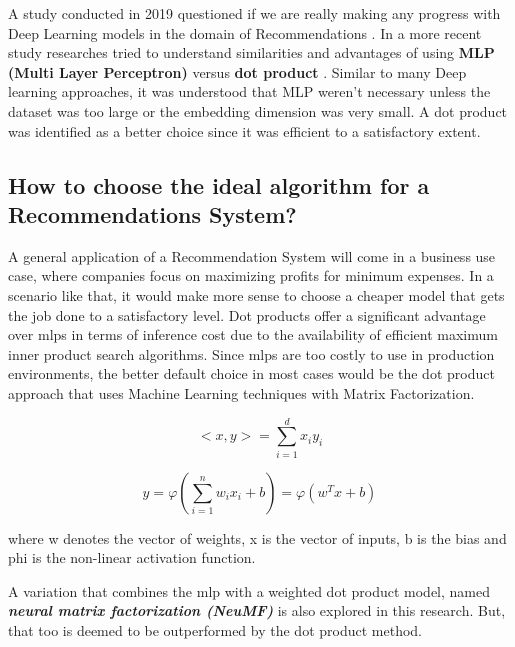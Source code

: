 A study conducted in 2019 questioned if we are really making any progress with Deep Learning models in the domain of Recommendations \autocite{dacrema_are_2019}. In a more recent study researches tried to understand similarities and advantages of using \textbf{MLP (Multi Layer Perceptron)} versus \textbf{dot product} \autocite{rendle_neural_2020}. Similar to many Deep learning approaches, it was understood that MLP weren't necessary unless the dataset was too large or the embedding dimension was very small. A dot product was identified as a better choice since it was efficient to a satisfactory extent.

\subsection{How to choose the ideal algorithm for a Recommendations System?}

A general application of a Recommendation System will come in a business use case, where companies focus on maximizing profits for minimum expenses. In a scenario like that, it would make more sense to choose a cheaper model that gets the job done to a satisfactory level. Dot products offer a significant advantage over \gls{mlp}s in terms of inference cost due to the availability of efficient maximum inner product search algorithms. Since \gls{mlp}s are too costly to use in production environments, the better default choice in most cases would be the dot product approach that uses Machine Learning techniques with Matrix Factorization.

\begin{equation}
<x,y>  = \sum_{i=1}^{d}x_{i}y_{i}
\end{equation}

\begin{equation}
y = \varphi(\sum_{i=1}^{n}w_{i}x_{i}+b) = \varphi(w^{T}x+b)
\end{equation}

where w denotes the vector of weights, x is the vector of inputs, b is the bias and phi is the non-linear activation function.

A variation that combines the \gls{mlp} with a weighted dot product model, named \textbf{\emph{neural matrix factorization (NeuMF)}} is also explored in this research. But, that too is deemed to be outperformed by the dot product method.

